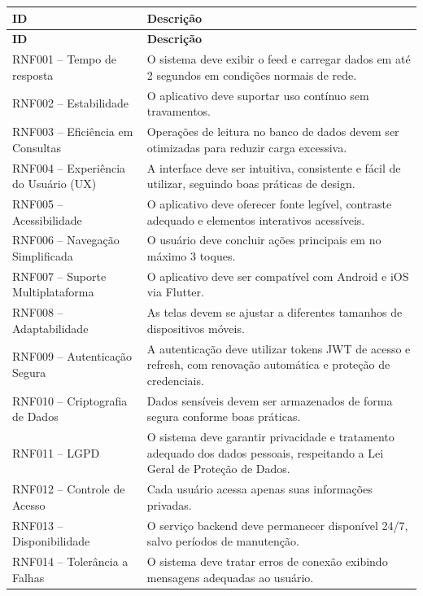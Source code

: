 \begin{longtable}{|p{4cm}|p{10cm}|}
  \hline
  \textbf{ID} & \textbf{Descrição} \\
  \hline
  \endfirsthead
  \hline
  \textbf{ID} & \textbf{Descrição} \\
  \hline
  \endhead
  RNF001 – Tempo de resposta & O sistema deve exibir o feed e carregar dados em até 2 segundos em condições normais de rede. \\
  \hline
  RNF002 – Estabilidade & O aplicativo deve suportar uso contínuo sem travamentos. \\
  \hline
  RNF003 – Eficiência em Consultas & Operações de leitura no banco de dados devem ser otimizadas para reduzir carga excessiva. \\
  \hline
  RNF004 – Experiência do Usuário (UX) & A interface deve ser intuitiva, consistente e fácil de utilizar, seguindo boas práticas de design. \\
  \hline
  RNF005 – Acessibilidade & O aplicativo deve oferecer fonte legível, contraste adequado e elementos interativos acessíveis. \\
  \hline
  RNF006 – Navegação Simplificada & O usuário deve concluir ações principais em no máximo 3 toques. \\
  \hline
  RNF007 – Suporte Multiplataforma & O aplicativo deve ser compatível com Android e iOS via Flutter. \\
  \hline
  RNF008 – Adaptabilidade & As telas devem se ajustar a diferentes tamanhos de dispositivos móveis. \\
  \hline
  RNF009 – Autenticação Segura & A autenticação deve utilizar tokens JWT de acesso e refresh, com renovação automática e proteção de credenciais. \\
  \hline
  RNF010 – Criptografia de Dados & Dados sensíveis devem ser armazenados de forma segura conforme boas práticas. \\
  \hline
  RNF011 – LGPD & O sistema deve garantir privacidade e tratamento adequado dos dados pessoais, respeitando a Lei Geral de Proteção de Dados. \\
  \hline
  RNF012 – Controle de Acesso & Cada usuário acessa apenas suas informações privadas. \\
  \hline
  RNF013 – Disponibilidade & O serviço backend deve permanecer disponível 24/7, salvo períodos de manutenção. \\
  \hline
  RNF014 – Tolerância a Falhas & O sistema deve tratar erros de conexão exibindo mensagens adequadas ao usuário. \\

\end{longtable}
